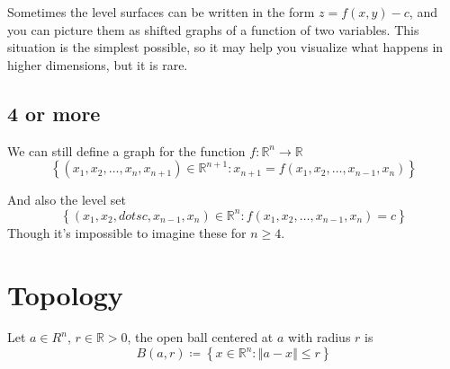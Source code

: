 \documentclass[11pt]{book}
\begin{document}
Sometimes the level surfaces can be written in the form $z=f(x,y)-c$, and you can picture them as shifted graphs of a function of two variables. This situation is the simplest possible, so it may help you visualize what happens in higher dimensions, but it is rare.



\subsection{4 or more}%
\label{sub:4_or_more}

We can still define a graph for the function $f : \mathbb{R} ^{n}  \to \mathbb{R}  $ 
\[
    \left\{ \left( x_{1} , x_{2} , \dotsc  , x_{n } , x_{n + 1}  \right) \in \mathbb{R} ^{n + 1} : x_{n + 1} = f\left(x_{1} , x_{2} , \dotsc  , x_{n - 1} , x_{n} \right)   \right\} 
\]

And also the level set
\[
    \left\{ \left( x_{1} ,  x_{2} ,  dotsc ,  x_{n - 1} ,  x_{n}  \right) \in \mathbb{R} ^{n} : f\left(x_{1} , x_{2} , \dotsc  , x_{n - 1} , x_{n} \right) = c \right\} 
\]
Though it's impossible to imagine these for $n\ge 4$. 




\section{Topology}%
\label{sec:topology}

\begin{defn}\label{defn:open_ball}
    Let $a \in R^{n} $, $r \in \mathbb{R} > 0$,  the open ball centered at $a$ with radius $r$ is
    \[
    B\left(a, r\right) \coloneqq \left\{ x\in \mathbb{R} ^{n} : \left\Vert a - x \right\Vert \le r \right\} 
    \]
\end{defn}
\end{document}
